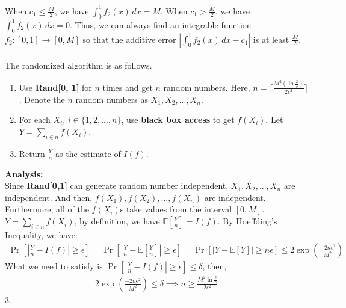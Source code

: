 When $c_1 \le \frac{M}{2}$, we have $\int_{0}^{1} f_2(x) \,dx=M$.
When $c_1 > \frac{M}{2}$, we have $\int_{0}^{1} f_2(x) \,dx=0$.
Thus, we can always find an integrable function 
$f_2 : [0, 1]\rightarrow [0, M]$ so that the additive error $|\int_{0}^{1} f_2(x) \,dx - c_1|$ is at least $\frac{M}{2}$.
\\
\noindent {}\\
The randomized algorithm is as follows.
\begin{enumerate}
    \item Use \textbf{Rand[0, 1]} for $n$ times and get $n$ random numbers.
    Here, $n=\lceil \frac{M^2(\ln \frac{2}{\delta})}{2\epsilon^2}\rceil $.
    Denote the $n$ random numbers as $X_1, X_2, ..., X_{n}$.
    \item For each $X_i$, $i\in \{1,2,...,n\}$, use \textbf{black box access} to get $f(X_i)$.
    Let $Y=\sum_{i\in n}f(X_i)$.
    \item Return $\frac{Y}{n}$ as the estimate of $I(f)$.
\end{enumerate}
\textbf{Analysis:}\\
Since \textbf{Rand[0,1]} can generate random number independent,
$X_1, X_2,..., X_{n}$ are independent.
And then, $f(X_1), f(X_2),..., f(X_{n})$ are independent.
Furthermore, all of the $f(X_i)$s take values from the interval $[0, M]$.
$Y=\sum_{i\in n}f(X_i)$, by definition, we have $\mathbb{E}[\frac{Y}{n}]=I(f)$.
By Hoeffding's Inequality, we have:
\begin{align}
    \nonumber \Pr[|\frac{Y}{n}-I(f)|\ge\epsilon]=\Pr[|\frac{Y}{n}-\mathbb{E}[\frac{Y}{n}]|\ge\epsilon]
    =\Pr[|Y-\mathbb{E}[Y]|\ge n\epsilon]\le 2\exp({\frac{-2n\epsilon^2}{M^2}})
\end{align}
What we need to satisfy is $\Pr[|\frac{Y}{n}-I(f)|\ge\epsilon]\le \delta$, then,
\begin{align}
    \nonumber 2\exp({\frac{-2n\epsilon^2}{M^2}}) \le \delta \implies n\ge \frac{M^2\ln \frac{2}{\delta}}{2\epsilon^2}
\end{align}
3.
